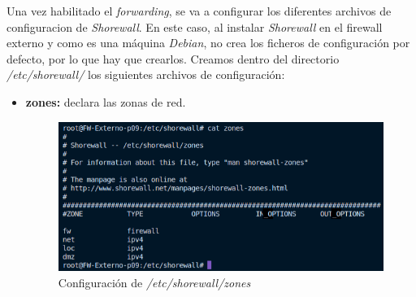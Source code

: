 \documentclass[11pt]{report}
\begin{document}
Una vez habilitado el \emph{forwarding}, se va a configurar los diferentes archivos de configuracion
de \emph{Shorewall}.
En este caso, al instalar \emph{Shorewall} en el firewall externo y como es una máquina \emph{Debian}, no crea los ficheros
de configuración por defecto, por lo que hay que crearlos. Creamos dentro del directorio \emph{/etc/shorewall/} los siguientes
archivos de configuración:
\begin{itemize}
  \item \textbf{zones:} declara las zonas de red.
  \begin{figure}[H]
    \centering
    \includegraphics[scale=0.7]{img/zones.png}
    \caption{Configuración de \emph{/etc/shorewall/zones}}
    \label{fig:Configuracion de /etc/shorewall/zones}
  \end{figure}

  \cleardoublepage


\end{itemize}
\end{document}
